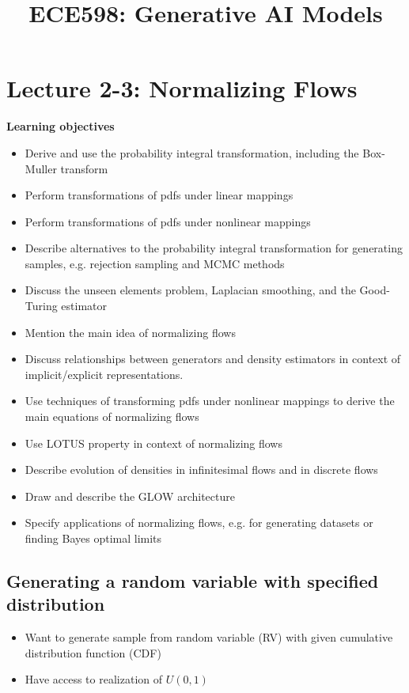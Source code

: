 \documentclass[12pt,a4paper]{article}
\title{ECE598: Generative AI Models}
\begin{document}
\maketitle

\section{Lecture 2-3: Normalizing Flows}
\textbf{Learning objectives}

\begin{itemize}
\item Derive and use the probability integral transformation, including the Box-Muller transform
\item Perform transformations of pdfs under linear mappings
\item Perform transformations of pdfs under nonlinear mappings
\item Describe alternatives to the probability integral transformation for generating samples, e.g. rejection sampling and MCMC methods
\item Discuss the unseen elements problem, Laplacian smoothing, and the Good-Turing estimator
\item Mention the main idea of normalizing flows
\item Discuss relationships between generators and density estimators in context of implicit/explicit representations.
\item Use techniques of transforming pdfs under nonlinear mappings to derive the main equations of normalizing flows
\item Use LOTUS property in context of normalizing flows
\item Describe evolution of densities in infinitesimal flows and in discrete flows
\item Draw and describe the GLOW architecture
\item Specify applications of normalizing flows, e.g. for generating datasets or finding Bayes optimal limits
\end{itemize}

\subsection{Generating a random variable with specified distribution}

\begin{itemize}
\item Want to generate sample from random variable (RV) with given cumulative distribution function (CDF)
\item Have access to realization of $U(0,1)$
\end{itemize}
\end{document}
